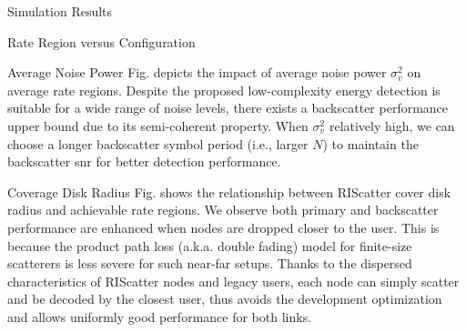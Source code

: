 \documentclass[journal]{IEEEtran}
\begin{document}
\begin{section}{Simulation Results}
\begin{subsection}{Rate Region versus Configuration}
		\begin{subsubsection}{Average Noise Power}
			Fig.  depicts the impact of average noise power $\sigma_v^2$ on average rate regions.
			Despite the proposed low-complexity energy detection is suitable for a wide range of noise levels, there exists a backscatter performance upper bound due to its semi-coherent property.
			When $\sigma_v^2$ relatively high, we can choose a longer backscatter symbol period (i.e., larger $N$) to maintain the backscatter \gls{snr} for better detection performance.
		\end{subsubsection}

		\begin{subsubsection}{Coverage Disk Radius}
			Fig.  shows the relationship between RIScatter cover disk radius and achievable rate regions.
			We observe both primary and backscatter performance are enhanced when nodes are dropped closer to the user.
			This is because the product path loss (a.k.a. double fading) model for finite-size scatterers is less severe for such near-far setups.
			Thanks to the dispersed characteristics of RIScatter nodes and legacy users, each node can simply scatter and be decoded by the closest user, thus avoids the development optimization and allows uniformly good performance for both links.
		\end{subsubsection}
	\end{subsection}
	\label{se:simulation_results}
\end{section}
\end{document}
